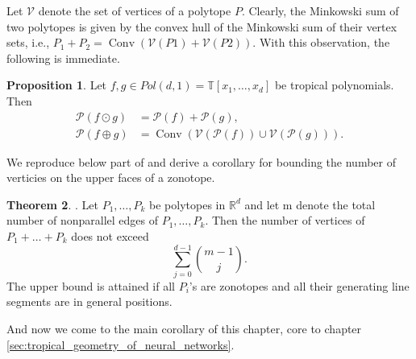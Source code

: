 \documentclass{article}
\theoremstyle{definition}
\newtheorem{theorem}{Theorem}[section]
\newtheorem{proposition}[theorem]{Proposition}
\DeclareMathOperator{\Conv}{Conv}
\begin{document}
Let $\mathcal{V}$ denote the set of vertices of a polytope $P$. Clearly, the Minkowski sum of two polytopes is given by the convex hull of the Minkowski sum of their vertex sets, i.e., $P_{1} + P_{2} = \Conv(\mathcal{V}(P1) + \mathcal{V}(P2))$. With this observation, the
following is immediate.

\begin{proposition} \cite[p.~4]{zhang2018tropical}
Let $f, g \in Pol(d, 1) = \mathbb{T}[x_1, \dots , x_d]$ be tropical polynomials. Then
\begin{align*}
\mathcal{P}(f \odot g) &= \mathcal{P}(f) + \mathcal{P}(g), \\
\mathcal{P}(f \oplus g) &= \Conv(\mathcal{V}(\mathcal{P}(f)) \cup \mathcal{V}( \mathcal{P}(g))).
\end{align*}
\end{proposition}

We reproduce below part of \cite[Theorem 2.1.20]{gritzmann1993minkowski} and derive a corollary for bounding the number of verticies on the upper faces of a zonotope.

\begin{theorem}
\label{theo:gritzmann_sturmfels}
\cite{gritzmann1993minkowski}. Let $P_1, \dots , P_k$ be polytopes in $\mathbb{R}^{d}$ and let m denote the total number of nonparallel edges of $P_1, \dots , P_k$. Then the number of vertices of $P_1 + \dots + P_k$ does not exceed
$$\sum_{j=0}^{d-1} \binom{m-1}{j}.$$
The upper bound is attained if all $P_i$'s are zonotopes and all their generating line segments are in general positions.
\end{theorem}

And now we come to the main corollary of this chapter, core to chapter \ref{sec:tropical_geometry_of_neural_networks}.
\end{document}

